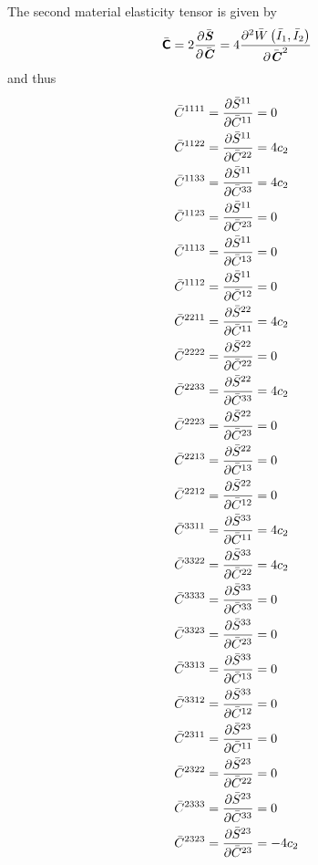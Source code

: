 The second material elasticity tensor is given by
\begin{equation}
  \bar{\boldsymbol{\mathsf{C}}}=2 \dfrac{\partial \bar{\boldsymbol{\mathit{S}}}}{\partial \bar{\boldsymbol{\mathit{C}}}} =4 \dfrac{\partial^{2}  \bar{W}\left( \bar{I}_{1},\bar{I}_{2} \right) }{\partial {\bar{\ensuremath{\boldsymbol{\mathit{C}}}}}^{2}} \\
\end{equation}
and thus
\begin{equation}
  \begin{split}
    \bar{C}^{1111}&=\delby{\bar{S}^{11}}{\bar{C}^{11}}=0\\
    \bar{C}^{1122}&=\delby{\bar{S}^{11}}{\bar{C}^{22}}=4c_{2}\\
    \bar{C}^{1133}&=\delby{\bar{S}^{11}}{\bar{C}^{33}}=4c_{2}\\
    \bar{C}^{1123}&=\delby{\bar{S}^{11}}{\bar{C}^{23}}=0\\
    \bar{C}^{1113}&=\delby{\bar{S}^{11}}{\bar{C}^{13}}=0\\
    \bar{C}^{1112}&=\delby{\bar{S}^{11}}{\bar{C}^{12}}=0\\
    \bar{C}^{2211}&=\delby{\bar{S}^{22}}{\bar{C}^{11}}=4c_{2}\\
    \bar{C}^{2222}&=\delby{\bar{S}^{22}}{\bar{C}^{22}}=0\\
    \bar{C}^{2233}&=\delby{\bar{S}^{22}}{\bar{C}^{33}}=4c_{2}\\
    \bar{C}^{2223}&=\delby{\bar{S}^{22}}{\bar{C}^{23}}=0\\
    \bar{C}^{2213}&=\delby{\bar{S}^{22}}{\bar{C}^{13}}=0\\
    \bar{C}^{2212}&=\delby{\bar{S}^{22}}{\bar{C}^{12}}=0\\
    \bar{C}^{3311}&=\delby{\bar{S}^{33}}{\bar{C}^{11}}=4c_{2}\\
    \bar{C}^{3322}&=\delby{\bar{S}^{33}}{\bar{C}^{22}}=4c_{2}\\
    \bar{C}^{3333}&=\delby{\bar{S}^{33}}{\bar{C}^{33}}=0\\
    \bar{C}^{3323}&=\delby{\bar{S}^{33}}{\bar{C}^{23}}=0\\
    \bar{C}^{3313}&=\delby{\bar{S}^{33}}{\bar{C}^{13}}=0\\
    \bar{C}^{3312}&=\delby{\bar{S}^{33}}{\bar{C}^{12}}=0\\
    \bar{C}^{2311}&=\delby{\bar{S}^{23}}{\bar{C}^{11}}=0\\
    \bar{C}^{2322}&=\delby{\bar{S}^{23}}{\bar{C}^{22}}=0\\
    \bar{C}^{2333}&=\delby{\bar{S}^{23}}{\bar{C}^{33}}=0\\
    \bar{C}^{2323}&=\delby{\bar{S}^{23}}{\bar{C}^{23}}=-4c_{2}\\

\end{split}
\end{equation}
